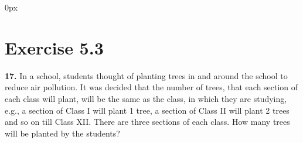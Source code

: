\documentclass[journal,12pt,twocolumn]{IEEEtran}
\begin{document}
	\parindent 0px
	
	

	
	\title{}
	\author{EE23BTECH11209 - K S Ballvardhan$^{*}$
	}
	\maketitle
	\newpage
	\bigskip
	
	
	
	\section*{Exercise 5.3}
	
	\noindent \textbf{17.} In a school, students thought of planting trees in and around the school to reduce air pollution. It was decided that the number of trees, that each section of each class will plant, will be the same as the class, in which they are studying, e.g., a section of Class I
	will plant 1 tree, a section of Class II will plant 2 trees and so on till Class XII. There are
	three sections of each class. How many trees will be planted by the students?\\
	
	\solution
        \fi
	
\end{document}
